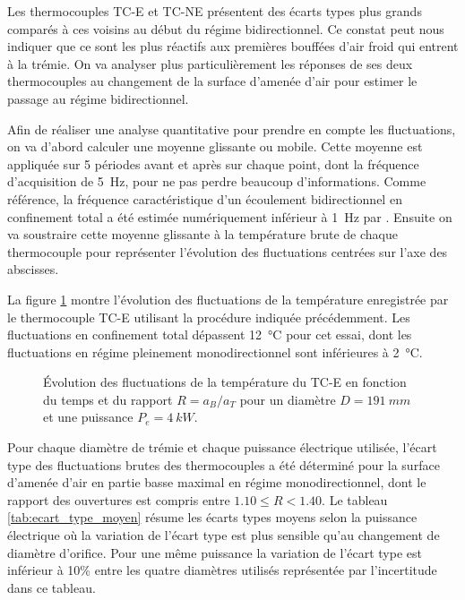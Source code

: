 Les thermocouples TC-E et TC-NE présentent des écarts types plus grands comparés à ces voisins au début du régime bidirectionnel. Ce constat peut nous indiquer que ce sont les plus réactifs aux premières bouffées d'air froid qui entrent à la trémie. On va analyser plus particulièrement les réponses de ses deux thermocouples au changement de la surface d'amenée d'air pour estimer le passage au régime bidirectionnel.

Afin de réaliser une analyse quantitative pour prendre en compte les fluctuations, on va d'abord calculer une moyenne glissante ou mobile. Cette moyenne est appliquée sur 5 périodes avant et après sur chaque point, dont la fréquence d'acquisition de \SI{5}{Hz}, pour ne pas perdre beaucoup d'informations. Comme référence, la fréquence caractéristique d'un écoulement bidirectionnel en confinement total a été estimée numériquement inférieur à \SI{1}{Hz} par \textcite{harrison_spall_2003}. Ensuite on va soustraire cette moyenne glissante à la température brute de chaque thermocouple pour représenter l'évolution des fluctuations centrées sur l'axe des abscisses.

La figure \ref{fig:tc_gliss_est_2R} montre l'évolution des fluctuations de la température enregistrée par le thermocouple TC-E utilisant la procédure indiquée précédemment. Les fluctuations en confinement total dépassent \SI{12}{\celsius} pour cet essai, dont les fluctuations en régime pleinement monodirectionnel sont inférieures à \SI{2}{\celsius}.

\begin{figure}
\centering
\resizebox{0.8\textwidth}{!}{}
\caption{Évolution des fluctuations de la température du TC-E en fonction du temps et du rapport $R=a_B/a_T$ pour un diamètre $D=\SI{191}{mm}$ et une puissance $P_e=\SI{4}{kW}$.}
\label{fig:tc_gliss_est_2R}
\end{figure}

Pour chaque diamètre de trémie et chaque puissance électrique utilisée, l'écart type des fluctuations brutes des thermocouples a été déterminé pour la surface d'amenée d'air en partie basse maximal en régime monodirectionnel, dont le rapport des ouvertures est compris entre $1.10 \leq R < 1.40$. Le tableau \ref{tab:ecart_type_moyen} résume les écarts types moyens selon la puissance électrique où la variation de l'écart type est plus sensible qu'au changement de diamètre d'orifice. Pour une même puissance la variation de l'écart type est inférieur à 10\% entre les quatre diamètres utilisés représentée par l'incertitude dans ce tableau.


